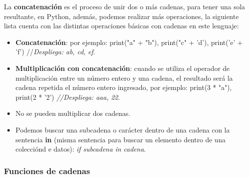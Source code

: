 La \textbf{concatenación} es el proceso de unir dos o más cadenas, para tener una sola resultante, en Python, además, podemos realizar más operaciones, la siguiente lista cuenta con las distintas operaciones básicas con cadenas en este lenguaje:
\begin{itemize}
	\item \textbf{Concatenación}: por ejemplo: print("a" + "b"), print("c" + 'd'), print('e' + 'f') //\textit{Despliega: ab, cd, ef}.
	\item \textbf{Multiplicación con concatenación}: cuando se utiliza el operador de multiplicación entre un número entero y una cadena, el resultado será la cadena repetida el número entero ingresado, por ejemplo: print(3 * "a"), print(2 * '2') \textit{//Despliega: aaa, 22}.
	\item No se pueden multiplicar dos cadenas.
	\item Podemos buscar una subcadena o carácter dentro de una cadena con la sentencia \textbf{in} (misma sentencia para buscar un elemento dentro de una colecciónd e datos): \textit{if subcadena in cadena}.
\end{itemize}


\subsubsection{Funciones de cadenas}

